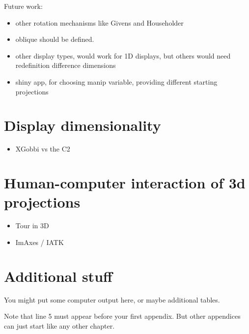 \documentclass{monashthesis}
\begin{document}
Future work:

\begin{itemize}
\tightlist
\item
  other rotation mechanisms like Givens and Householder
\item
  oblique should be defined.
\item
  other display types, would work for 1D displays, but others would need redefinition difference dimensions
\item
  shiny app, for choosing manip variable, providing different starting projections
\end{itemize}

\hypertarget{ch:disp_dim}{%
\chapter{Display dimensionality}\label{ch:disp_dim}}

\begin{itemize}
\tightlist
\item
  XGobbi vs the C2
\end{itemize}

\hypertarget{ch:hci_3dproj}{%
\chapter{Human-computer interaction of 3d projections}\label{ch:hci_3dproj}}

\begin{itemize}
\tightlist
\item
  Tour in 3D
\item
  ImAxes / IATK
\end{itemize}

\appendix

\hypertarget{additional-stuff}{%
\chapter{Additional stuff}\label{additional-stuff}}

You might put some computer output here, or maybe additional tables.

Note that line 5 must appear before your first appendix. But other appendices can just start like any other chapter.

\printbibliography[heading=bibintoc]
\end{document}
